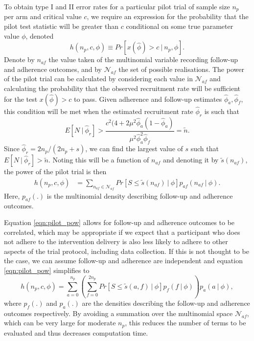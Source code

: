 \documentclass{article}
\begin{document}
To obtain type I and II error rates for a particular pilot trial of sample size $n_p$ per arm and critical value $c$, we require an expression for the probability that the pilot test statistic will be greater than $c$ conditional on some true parameter value $\phi$, denoted
$$
h(n_p, c, \phi) \equiv Pr[x(\hat{\phi}) > c ~|~ n_p, \phi].
$$
Denote by $n_{af}$ the value taken of the multinomial variable recording follow-up and adherence outcomes, and by $\mathcal{N}_{af}$ the set of possible realisations. The power of the pilot trial can be calculated by considering each value in $\mathcal{N}_{af}$ and calculating the probability that the observed recruitment rate will be sufficient for the test $x(\hat{\phi}) > c$ to pass. Given adherence and follow-up estimates $\hat{\phi}_a, \hat{\phi}_f$, this condition will be met when the estimated recruitment rate $\hat{\phi}_r$ is such that
$$
E[N ~|~ \hat{\phi}_r] > \frac{c^2(4 + 2 \mu^2 \hat{\phi}_a (1- \hat{\phi}_a)}{\mu^2 \hat{\phi}_a^2 \hat{\phi}_f} = \tilde{n}.
$$ 
Since $\hat{\phi}_r = 2n_p/(2n_p + s)$, we can find the largest value of $s$ such that $E[N ~|~ \hat{\phi}_r] > \tilde{n}$. Noting this will be a function of $n_{af}$ and denoting it by $\tilde{s}(n_{af})$, the power of the pilot trial is then
\begin{align}\label{eqn:pilot_pow}
h(n_p, c, \phi) &= \sum_{n_{af} \in \mathcal{N}_{af}} 
Pr\left[S \leq \tilde{s}(n_{af}) ~|~ \phi \right] 
p_{af}(n_{af} ~|~ \phi).
\end{align}
Here, $p_{af}(.)$ is the multinomial density describing follow-up and adherence outcomes.

Equation \ref{eqn:pilot_pow} allows for follow-up and adherence outcomes to be correlated, which may be appropriate if we expect that a participant who does not adhere to the intervention delivery is also less likely to adhere to other aspects of the trial protocol, including data collection. If this is not thought to be the case, we can assume follow-up and adherence are independent and equation \ref{eqn:pilot_pow} simplifies to
\begin{equation*}
h(n_p, c, \phi) = \sum_{a=0}^{n_p} \left(  \sum_{f=0}^{2n_p} 
Pr\left[S \leq \tilde{s}(a,f) ~|~ \phi \right] 
p_{f}(f ~|~ \phi)  \right) p_a(a ~|~ \phi),
\end{equation*}
where $p_f(.)$ and $p_a(.)$ are the densities describing the follow-up and adherence outcomes respectively. By avoiding a summation over the multinomial space $\mathcal{N}_{af}$, which can be very large for moderate $n_p$, this reduces the number of terms to be evaluated and thus decreases computation time.
\end{document}
